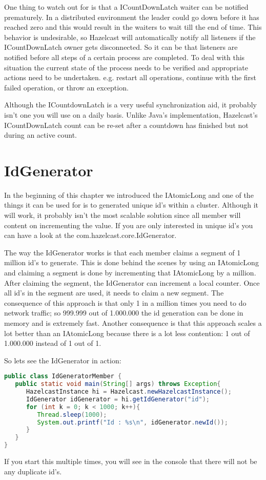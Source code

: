 One thing to watch out for is that a ICountDownLatch waiter can be notified prematurely. In a distributed environment the leader could go down before it has reached zero and this would result in the waiters to wait till the end of time. This behavior is undesirable, so Hazelcast will automatically notify all listeners if the ICountDownLatch owner gets disconnected. So it can be that listeners are notified before all steps of a certain process are completed. To deal with this situation the current state of the process needs to be verified and appropriate actions need to be undertaken. e.g. restart all operations, continue with the first failed operation, or throw an exception.

Although the ICountdownLatch is a very useful synchronization aid, it probably isn't one you will use on a daily basis. Unlike Java's implementation, Hazelcast's ICountDownLatch count can be re-set after a countdown has finished but not during an active count. 

\section{IdGenerator}
In the beginning of this chapter we introduced the IAtomicLong and one of the things it can be used for is to generated unique id's within a cluster. Although it will work, it probably isn't the most scalable solution since all member will content on incrementing the value. If you are only interested in unique id's you can have a look at the com.hazelcast.core.IdGenerator.

The way the IdGenerator works is that each member claims a segment of 1 million id's to generate. This is done behind the scenes by using an IAtomicLong and claiming a segment is done by incrementing that IAtomicLong by a million. After claiming the segment, the IdGenerator can increment a local counter. Once all id's in the segment are used, it needs to claim a new segment. The consequence of this approach is that only 1 in a million times you need to do network traffic; so 999.999 out of 1.000.000 the id generation can be done in memory and is extremely fast. Another consequence is that this approach scales a lot better than an IAtomicLong because there is a lot less contention: 1 out of 1.000.000 instead of 1 out of 1.

So lets see the IdGenerator in action:
\begin{lstlisting}[language=java]
public class IdGeneratorMember {
   public static void main(String[] args) throws Exception{
      HazelcastInstance hi = Hazelcast.newHazelcastInstance();
      IdGenerator idGenerator = hi.getIdGenerator("id");
      for (int k = 0; k < 1000; k++){
         Thread.sleep(1000);
         System.out.printf("Id : %s\n", idGenerator.newId());
      }
   }
}
\end{lstlisting}
If you start this multiple times, you will see in the console that there will not be any duplicate id's.

